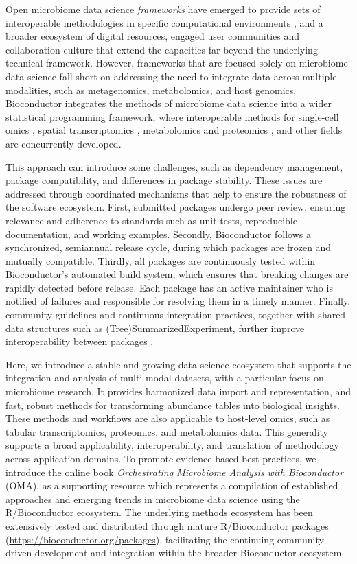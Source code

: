 \documentclass[
  sn-nature,
]{sn-jnl}
\begin{document}
Open microbiome data science \emph{frameworks} have emerged to provide
sets of interoperable methodologies in specific computational
environments \citep{eren2021, schloss2009, bolyen2019, mcmurdie2012},
and a broader ecosystem of digital resources, engaged user communities
and collaboration culture that extend the capacities far beyond the
underlying technical framework. However, frameworks that are focused
solely on microbiome data science fall short on addressing the need to
integrate data across multiple modalities, such as metagenomics,
metabolomics, and host genomics. Bioconductor integrates the methods of
microbiome data science into a wider statistical programming framework,
where interoperable methods for single-cell omics \citep{amezquita2020},
spatial transcriptomics \citep{crowell2025}, metabolomics and proteomics
\citep{anwar2025}, and other fields are concurrently developed.

This approach can introduce some challenges, such as dependency
management, package compatibility, and differences in package stability.
These issues are addressed through coordinated mechanisms that help to
ensure the robustness of the software ecosystem. First, submitted
packages undergo peer review, ensuring relevance and adherence to
standards such as unit tests, reproducible documentation, and working
examples. Secondly, Bioconductor follows a synchronized, semiannual
release cycle, during which packages are frozen and mutually compatible.
Thirdly, all packages are continuously tested within Bioconductor's
automated build system, which ensures that breaking changes are rapidly
detected before release. Each package has an active maintainer who is
notified of failures and responsible for resolving them in a timely
manner. Finally, community guidelines and continuous integration
practices, together with shared data structures such as
(Tree)SummarizedExperiment, further improve interoperability between
packages \citep{drnevich2025}.

Here, we introduce a stable and growing data science ecosystem that
supports the integration and analysis of multi-modal datasets, with a
particular focus on microbiome research. It provides harmonized data
import and representation, and fast, robust methods for transforming
abundance tables into biological insights. These methods and workflows
are also applicable to host-level omics, such as tabular
transcriptomics, proteomics, and metabolomics data. This generality
supports a broad applicability, interoperability, and translation of
methodology across application domains. To promote evidence-based best
practices, we introduce the online book \emph{Orchestrating Microbiome
Analysis with Bioconductor} (OMA), as a supporting resource which
represents a compilation of established approaches and emerging trends
in microbiome data science using the R/Bioconductor ecosystem. The
underlying methods ecosystem has been extensively tested and distributed
through mature R/Bioconductor packages
(\url{https://bioconductor.org/packages}), facilitating the continuing
community-driven development and integration within the broader
Bioconductor ecosystem.
\end{document}

